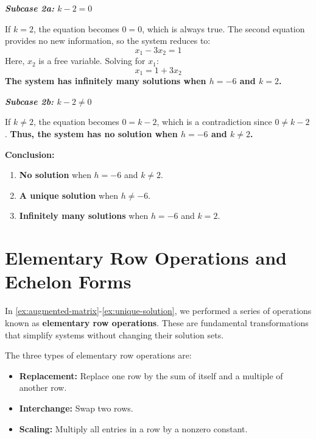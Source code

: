 \begin{example}
\begin{solution}
        \textbf{\textit{Subcase 2a:} $k - 2 = 0$}
        
          If $k = 2$, the equation becomes $0 = 0$, which is always true. The second equation provides no new information, so the system reduces to:
          \[
          x_1 - 3x_2 = 1
          \]
          Here, $x_2$ is a free variable. Solving for $x_1$:
          \[
          x_1 = 1 + 3x_2
          \]
          \textbf{The system has infinitely many solutions when $h = -6$ and $k = 2$.}
        
        \textbf{\textit{Subcase 2b:} $k - 2 \ne 0$}
        
          If $k \ne 2$, the equation becomes $0 = k - 2$, which is a contradiction since $0 \ne k - 2$. \textbf{Thus, the system has no solution when $h = -6$ and $k \ne 2$.}
                
        \textbf{Conclusion:}
        
        \begin{enumerate}[label=(\roman*)]
            \item \textbf{No solution} when $h = -6$ and $k \ne 2$.
            \item \textbf{A unique solution} when $h \ne -6$.
            \item \textbf{Infinitely many solutions} when $h = -6$ and $k = 2$.
        \end{enumerate} \end{solution}


\end{example}
\section{Elementary Row Operations and Echelon Forms}

In \autoref{ex:augmented-matrix}-\autoref{ex:unique-solution}, we performed a series of operations known as \textbf{elementary row operations}. These are fundamental transformations that simplify systems without changing their solution sets.

The three types of elementary row operations are:
\begin{itemize}
    \item \textbf{Replacement:} Replace one row by the sum of itself and a multiple of another row.
    \item \textbf{Interchange:} Swap two rows.
    \item \textbf{Scaling:} Multiply all entries in a row by a nonzero constant.
\end{itemize}

